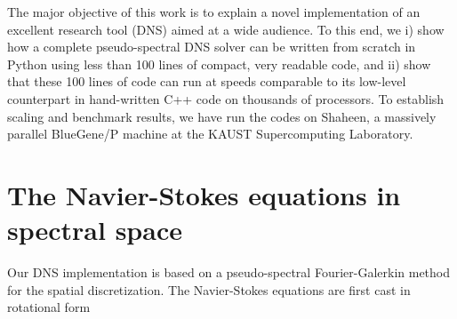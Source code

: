 \documentclass[11pt, oneside]{article}
\begin{document}
The major objective of this work is to explain a novel implementation of an excellent research tool (DNS) aimed at a wide audience. To this end, we i) show how a complete pseudo-spectral DNS solver can be written from scratch in Python using less than 100 lines of compact, very readable code, and ii) show that these 100 lines of code can run at speeds comparable to its low-level counterpart in hand-written C++ code on thousands of processors. To establish scaling and benchmark results, we have run the codes on Shaheen, a massively parallel BlueGene/P machine at the KAUST Supercomputing Laboratory.

\section{The Navier-Stokes equations in spectral space}
Our DNS implementation is based on a pseudo-spectral Fourier-Galerkin method \cite{canuto1988} for the spatial discretization. The Navier-Stokes equations are first cast in rotational form
\end{document}
